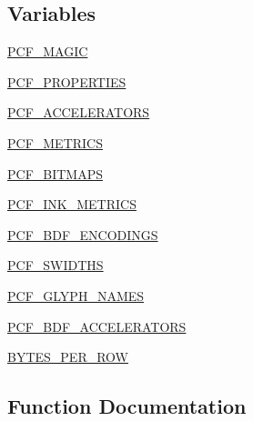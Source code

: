\subsection*{Variables}
\begin{DoxyCompactItemize}
\item 
\hyperlink{namespacePIL_1_1PcfFontFile_a38ba676309f9a3bfd930c68453699423}{P\+C\+F\+\_\+\+M\+A\+G\+IC}
\item 
\hyperlink{namespacePIL_1_1PcfFontFile_acc7904f7bb72e18778573d4db6e8adbe}{P\+C\+F\+\_\+\+P\+R\+O\+P\+E\+R\+T\+I\+ES}
\item 
\hyperlink{namespacePIL_1_1PcfFontFile_a15cd9dd2557be7e56da5b24b5255bdbc}{P\+C\+F\+\_\+\+A\+C\+C\+E\+L\+E\+R\+A\+T\+O\+RS}
\item 
\hyperlink{namespacePIL_1_1PcfFontFile_a8a946e2076333ac67ef4177ea1a63b71}{P\+C\+F\+\_\+\+M\+E\+T\+R\+I\+CS}
\item 
\hyperlink{namespacePIL_1_1PcfFontFile_ab2125fe106996c2df0cd0a40e38fd6fd}{P\+C\+F\+\_\+\+B\+I\+T\+M\+A\+PS}
\item 
\hyperlink{namespacePIL_1_1PcfFontFile_a9ac013bfdfce284af78691ce9fc1693c}{P\+C\+F\+\_\+\+I\+N\+K\+\_\+\+M\+E\+T\+R\+I\+CS}
\item 
\hyperlink{namespacePIL_1_1PcfFontFile_ad292c65766c055b2ef98388a05e6b21f}{P\+C\+F\+\_\+\+B\+D\+F\+\_\+\+E\+N\+C\+O\+D\+I\+N\+GS}
\item 
\hyperlink{namespacePIL_1_1PcfFontFile_a36a306ddcd4233858d2f3d7df44e61fd}{P\+C\+F\+\_\+\+S\+W\+I\+D\+T\+HS}
\item 
\hyperlink{namespacePIL_1_1PcfFontFile_a77958cedd6d0b0387d0c7dc64ee4f7f8}{P\+C\+F\+\_\+\+G\+L\+Y\+P\+H\+\_\+\+N\+A\+M\+ES}
\item 
\hyperlink{namespacePIL_1_1PcfFontFile_a5241993963d80e8b3b6a039aa231c284}{P\+C\+F\+\_\+\+B\+D\+F\+\_\+\+A\+C\+C\+E\+L\+E\+R\+A\+T\+O\+RS}
\item 
\hyperlink{namespacePIL_1_1PcfFontFile_a585ca47e57b9a32fe99d4797cd50ec01}{B\+Y\+T\+E\+S\+\_\+\+P\+E\+R\+\_\+\+R\+OW}
\end{DoxyCompactItemize}


\subsection{Function Documentation}
\mbox{\label{namespacePIL_1_1PcfFontFile_a5b43932f8ab2eead2c334196489dfde2}} 
